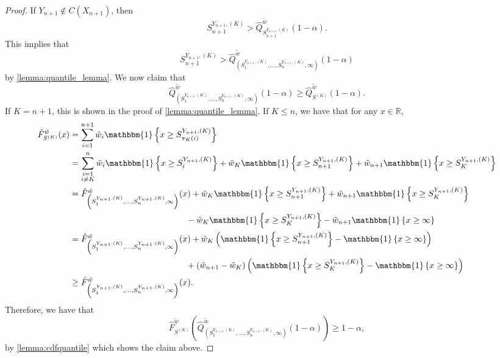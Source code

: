 \documentclass[11pt, titlepage]{article} %
\newcommand{\Ind}[1]{\mathbbm{1}\left\{ #1 \right\}}
\numberwithin{equation}{section}
\theoremstyle{definition}
\numberwithin{theorem}{section}
\numberwithin{lemma}{section}
\numberwithin{corollary}{section}
\numberwithin{proposition}{section}
\numberwithin{definition}{section}
\numberwithin{remark}{section}
\begin{document}
\begin{proof}
    If \(Y_{n+1} \not \in C(X_{n+1})\), then \[S_{n+1}^{Y_{n+1}, (K)} > \hat{Q}^{\tilde{w}}_{S_{n+1}^{Y_{n+1}, (K)}}(1-\alpha).\] This implies that \[S_{n+1}^{Y_{n+1}, (K)} > \hat{Q}^{\tilde{w}}_{\left( S_1^{Y_{n+1}, (K)}, \ldots, S_n^{Y_{n+1}, (K)}, \infty  \right)}(1-\alpha)\] by \cref{lemma:quantile_lemma}. We now claim that \[\hat{Q}^{\tilde{w}}_{\left( S_1^{Y_{n+1}, (K)}, \ldots, S_n^{Y_{n+1}, (K)}, \infty  \right)}(1-\alpha) \geq \hat{Q}^{\tilde{w}}_{S^{(K)}}(1-\alpha).\] If \(K = n+1\), this is shown in the proof of \cref{lemma:quantile_lemma}. If \(K \leq n\), we have that for any \(x \in \mathbb{R}\), \begin{align*}
        \hat{F}^{\tilde{w}}_{S^{(K)}}(x) &= \sum_{i=1}^{n+1} \tilde{w}_i \Ind{x \geq S_{\pi_K(i)}^{Y_{n+1}, (K)}} \\
        &= \sum_{\substack{i = 1 \\ i \neq K}}^{n} \tilde{w}_i \Ind{x \geq S_i^{Y_{n+1}, (K)}} + \tilde{w}_K \Ind{x \geq S_{n+1}^{Y_{n+1}, (K)}} + \tilde{w}_{n+1} \Ind{x \geq S_K^{Y_{n+1}, (K)}} \\
        &= \hat{F}^{\tilde{w}}_{\left( S_1^{Y_{n+1}, (K)}, \ldots, S_n^{Y_{n+1}, (K)}, \infty  \right)}(x) + \tilde{w}_K \Ind{x \geq S_{n+1}^{Y_{n+1}, (K)}} + \tilde{w}_{n+1} \Ind{x \geq S_K^{Y_{n+1}, (K)}} \\
        & \hspace{4.8cm} -  \tilde{w}_K \Ind{x \geq S_{K}^{Y_{n+1}, (K)}} - \tilde{w}_{n+1} \Ind{x \geq \infty} \\
        &= \hat{F}^{\tilde{w}}_{\left( S_1^{Y_{n+1}, (K)}, \ldots, S_n^{Y_{n+1}, (K)}, \infty  \right)}(x) + \tilde{w}_K \left( \Ind{x \geq S_{n+1}^{Y_{n+1}, (K)}} - \Ind{x \geq \infty} \right) \\
        & \hspace{4.8cm} + \left( \tilde{w}_{n+1} - \tilde{w}_K\right) \left(\Ind{x \geq S_{K}^{Y_{n+1}, (K)}} - \Ind{x \geq \infty} \right) \\
        & \geq \hat{F}^{\tilde{w}}_{\left( S_1^{Y_{n+1}, (K)}, \ldots, S_n^{Y_{n+1}, (K)}, \infty  \right)}(x).
    \end{align*}
    Therefore, we have that \[\hat{F}^{\tilde{w}}_{S^{(K)}}\left( \hat{Q}^{\tilde{w}}_{\left( S_1^{Y_{n+1}, (K)}, \ldots, S_n^{Y_{n+1}, (K)}, \infty  \right)}(1-\alpha) \right) \geq 1-\alpha,\] by \cref{lemma:cdfquantile} which shows the claim above. \vskip5pt


\end{proof}
\end{document}

